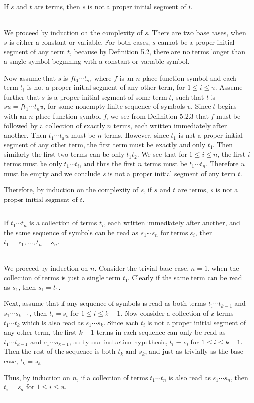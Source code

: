 \documentclass[11pt]{hmcpset}
\newenvironment{problem2}[1]{\noindent {\bf (#1}}
{\medskip}
\newenvironment{problem1}[1]{\noindent {\bf Problem #1}}
{\medskip}
\newenvironment{proof}{\noindent {\bf Proof:} \\}{\hfill
\rule{1mm}{3mm} \bigskip}
\begin{document}
\begin{problem1}{1. (a)} If $s$ and $t$ are terms, then $s$ is not a proper initial segment of $t$.

\begin{proof}\indent We proceed by induction on the complexity of $s$. There are two base cases, when $s$ is either a constant or variable. For both cases, $s$ cannot be a proper initial segment of any term $t$, because by Definition 5.2, there are no terms longer than a single symbol beginning with a constant or variable symbol.

Now assume that $s$ is $ft_1\cdots t_n$, where $f$ is an $n$-place function symbol and each term $t_i$ is not a proper initial segment of any other term, for $1\le i\le n$. Assume further that $s$ is a proper initial segment of some term $t$, such that $t$ is $su = ft_1\cdots t_nu$, for some nonempty finite sequence of symbols $u$. Since $t$ begins with an $n$-place function symbol $f$, we see from Definition 5.2.3 that $f$ must be followed by a collection of exactly $n$ terms, each written immediately after another. Then $t_1\cdots t_nu$ must be $n$ terms. However, since $t_1$ is not a proper initial segment of any other term, the first term must be exactly and only $t_1$. Then similarly the first two terms can be only $t_1t_2$. We see that for $1\le i\le n$, the first $i$ terms must be only $t_1\cdots t_i$, and thus the first $n$ terms must be $t_1\cdots t_n$. Therefore $u$ must be empty and we conclude $s$ is not a proper initial segment of any term $t$.

Therefore, by induction on the complexity of $s$, if $s$ and $t$ are terms, $s$ is not a proper initial segment of $t$.
\end{proof}
\end{problem1}

\begin{problem2}{b)}
If $t_1\cdots t_n$ is a collection of terms $t_i$, each written immediately after another, and the same sequence of symbols can be read as $s_1\cdots s_n$ for terms $s_i$, then $t_1=s_1,\ldots, t_n=s_n$.

\begin{proof}\indent We proceed by induction on $n$. Consider the trivial base case, $n=1$, when the collection of terms is just a single term $t_1$. Clearly if the same term can be read as $s_1$, then $s_1=t_1$.

Next, assume that if any sequence of symbols is read as both terms $t_1\cdots t_{k-1}$ and $s_1\cdots s_{k-1}$, then $t_i=s_i$ for $1\le i\le k-1$. Now consider a collection of $k$ terms $t_1\cdots t_k$ which is also read as $s_1\cdots s_k$. Since each $t_i$ is not a proper initial segment of any other term, the first $k-1$ terms in each sequence can only be read as $t_1\cdots t_{k-1}$ and $s_1\cdots s_{k-1}$, so by our induction hypothesis, $t_i=s_i$ for $1\le i\le k-1$. Then the rest of the sequence is both $t_k$ and $s_k$, and just as trivially as the base case, $t_k=s_k$.

Thus, by induction on $n$, if a collection of terms $t_1\cdots t_n$ is also read as $s_1\cdots s_n$, then $t_i=s_n$ for $1\le i\le n$.
\end{proof}
\end{problem2}
\end{document}
